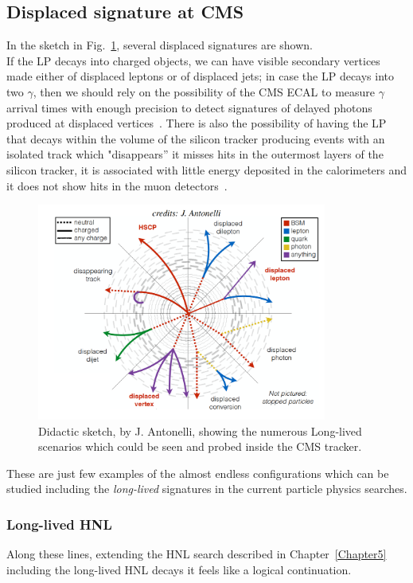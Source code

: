 \subsection{Displaced signature at CMS}
In the sketch in Fig.~\ref{fig:c6antonelli}, several displaced
signatures are shown.\\
If the LP decays into charged objects, we can have visible secondary vertices
made either of displaced leptons or of displaced jets; in case the LP decays into two $\gamma$,
then we should rely on the possibility of the CMS
ECAL to measure $\gamma$ arrival times with enough precision to detect
signatures of delayed photons produced at displaced
vertices~\cite{Sirunyan:2019wau}.
There is also the possibility of having the LP that decays within the
volume of the silicon tracker producing events with an isolated track
which "disappears'' \ie it misses hits in the outermost layers of the
silicon tracker, it is associated with little energy deposited in the
calorimeters and it does not show hits in the muon detectors~\cite{Sirunyan_2020disapp}. 
\begin{figure}[h]
\centering
\includegraphics[width=0.85\textwidth]{Figures/c6/antonelli_skech.pdf}
\caption{Didactic sketch, by J. Antonelli, showing the numerous
  Long-lived scenarios which could be seen and probed inside the CMS tracker. }
\label{fig:c6antonelli}
\end{figure}

These are just few examples of the almost endless configurations which can
be studied including the \emph{long-lived} signatures in the
current particle physics searches. 

\subsubsection{Long-lived HNL}
Along these lines, extending the HNL search described in
Chapter~\ref{Chapter5} including the long-lived HNL decays it feels like a logical
continuation. 


